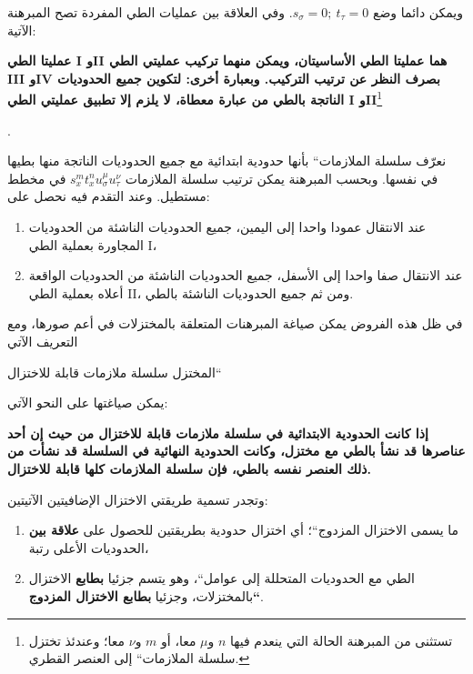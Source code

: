 \documentclass[11pt]{article}
\providecommand{\glqq}{\textquotedblbase}
\providecommand{\grqq}{\textquotedblleft}
\providecommand{\srcspaced}[1]{{\bfseries #1}}
\newcommand{\srcLTR}[1]{\relax\ifmmode\text{\mbox{\babelsublr{\foreignlanguage{english}{#1}}}}\else\babelsublr{\foreignlanguage{english}{#1}}\fi}
\newcommand{\srcfn}[2]{\begingroup\renewcommand{\thefootnote}{\srcLTR{#1}}\footnote{#2}\addtocounter{footnote}{-1}\endgroup}
\begin{document}
ويمكن دائما وضع $s_\sigma=0;\ t_\tau=0$. وفي العلاقة بين عمليات الطي المفردة تصح المبرهنة الآتية:

\srcspaced{عمليتا الطي I وII هما عمليتا الطي الأساسيتان، ويمكن منهما تركيب عمليتي الطي III وIV بصرف النظر عن ترتيب التركيب. وبعبارة أخرى: لتكوين جميع الحدوديات الناتجة بالطي من عبارة معطاة، لا يلزم إلا تطبيق عمليتي الطي I وII}\srcfn{2)}{تستثنى من المبرهنة الحالة التي ينعدم فيها $n$ و$\mu$ معا، أو $m$ و$\nu$ معا؛ وعندئذ تختزل \glqq{}سلسلة الملازمات\grqq{} إلى العنصر القطري.}.

نعرّف \glqq{}سلسلة الملازمات\grqq{} بأنها حدودية ابتدائية مع جميع الحدوديات الناتجة منها بطيها في نفسها. وبحسب المبرهنة يمكن ترتيب سلسلة الملازمات $s_x^m t_x^n u_\sigma^\mu u_\tau^\nu$ في مخطط مستطيل. وعند التقدم فيه نحصل على:
\begin{enumerate}
\item عند الانتقال عمودا واحدا إلى اليمين، جميع الحدوديات الناشئة من الحدوديات المجاورة بعملية الطي I،
\item عند الانتقال صفا واحدا إلى الأسفل، جميع الحدوديات الناشئة من الحدوديات الواقعة أعلاه بعملية الطي II، ومن ثم جميع الحدوديات الناشئة بالطي.
\end{enumerate}

في ظل هذه الفروض يمكن صياغة المبرهنات المتعلقة بالمختزلات في أعم صورها، ومع التعريف الآتي
\begin{center}
\glqq{}المختزل سلسلة ملازمات قابلة للاختزال\grqq{}
\end{center}
يمكن صياغتها على النحو الآتي:

\begin{center}
\srcspaced{إذا كانت الحدودية الابتدائية في سلسلة ملازمات قابلة للاختزال من حيث إن أحد عناصرها قد نشأ بالطي مع مختزل، وكانت الحدودية النهائية في السلسلة قد نشأت من ذلك العنصر نفسه بالطي، فإن سلسلة الملازمات كلها قابلة للاختزال.}
\end{center}

وتجدر تسمية طريقتي الاختزال الإضافيتين الآتيتين:
\begin{enumerate}
\item ما يسمى \glqq{}الاختزال المزدوج\grqq{}؛ أي اختزال حدودية بطريقتين للحصول على \srcspaced{علاقة بين} الحدوديات الأعلى رتبة،
\item \glqq{}الطي مع الحدوديات المتحللة إلى عوامل\grqq{}، وهو يتسم جزئيا \srcspaced{بطابع} الاختزال بالمختزلات، وجزئيا \srcspaced{بطابع \glqq{}الاختزال المزدوج\grqq{}}.
\end{enumerate}
\clearpage
\setcounter{footnote}{0}
\end{document}
